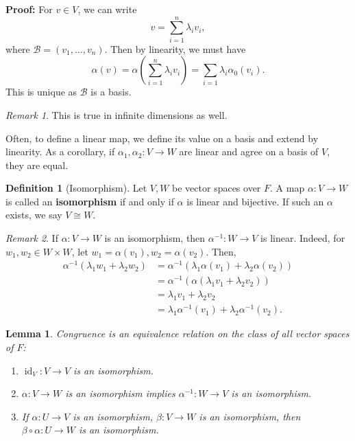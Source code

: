 \documentclass[12pt]{article}
\DeclareMathOperator{\id}{id}
\newtheorem{lemma}{Lemma}[section]
\theoremstyle{definition}
\newtheorem{definition}{Definition}[section]
\theoremstyle{remark}
\newtheorem*{remark}{Remark}
\begin{document}
\begin{adjustbox}{minipage = \columnwidth - 25.5pt, margin=1em, frame=1pt, margin=0em}
\textbf{Proof:} For $v \in V$, we can write
\[
v = \sum_{i = 1}^{n} \lambda_i v_i
,\]
where $\mathcal{B} = (v_1, \ldots, v_n)$. Then by linearity, we must have
\[
	\alpha(v) = \alpha \left( \sum_{i = 1}^{n} \lambda_i v_i \right) = \sum_{i = 1}^{}\lambda_i \alpha_0 (v_i)
.\]
This is unique as $\mathcal{B}$ is a basis.
\end{adjustbox}

\begin{remark}
	This is true in infinite dimensions as well.
\end{remark}

Often, to define a linear map, we define its value on a basis and extend by linearity. As a corollary, if $\alpha_1, \alpha_2 : V \to W$ are linear and agree on a basis of $V$, they are equal.

\begin{definition}[Isomorphism]
	Let $V, W$ be vector spaces over $F$. A map $\alpha : V \to W$ is called an \textbf{isomorphism} if and only if $\alpha$ is linear and bijective. If such an $\alpha$ exists, we say $V \cong W$.
\end{definition}

\begin{remark}
	If $\alpha : V \to W$ is an isomorphism, then $\alpha^{-1} : W \to V$ is linear. Indeed, for $w_1, w_2 \in W \times W$, let $w_1 = \alpha(v_1), w_2 = \alpha(v_2)$. Then,
	\begin{align*}
		\alpha^{-1}(\lambda_1 w_1 + \lambda_2 w_2) &= \alpha^{-1}(\lambda_1 \alpha(v_1) + \lambda_2 \alpha(v_2)) \\
							   &= \alpha^{-1} ( \alpha(\lambda_1 v_1 + \lambda_2 v_2) ) \\
							   &= \lambda_1 v_1 + \lambda_2 v_2 \\
							   &= \lambda_1 \alpha^{-1}(v_1) + \lambda_2 \alpha^{-1}(v_2).
	\end{align*}
\end{remark}

\begin{lemma}
	Congruence is an equivalence relation on the class of all vector spaces of $F$:
	\begin{enumerate}[\normalfont(i)]
		\item $\id_V : V \to V$ is an isomorphism.
		\item $\alpha : V \to W$ is an isomorphism implies $\alpha^{-1} : W \to V$ is an isomorphism.
		\item If $\alpha : U \to V$ is an isomorphism, $\beta : V \to W$ is an isomorphism, then $\beta \circ \alpha : U \to W$ is an isomorphism.
	\end{enumerate}
\end{lemma}
\end{document}
